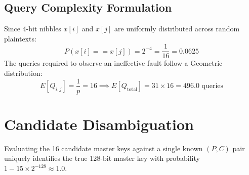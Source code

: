 \subsection{Query Complexity Formulation}
Since 4-bit nibbles $x[i]$ and $x[j]$ are uniformly distributed across random plaintexts:
\begin{equation}
    P(x[i] == x[j]) = 2^{-4} = \frac{1}{16} = 0.0625
\end{equation}
The queries required to observe an ineffective fault follow a Geometric distribution:
\begin{equation}
    E[Q_{i, j}] = \frac{1}{p} = 16 \implies E[Q_{\text{total}}] = 31 \times 16 = 496.0 \text{ queries}
\end{equation}

\section{Candidate Disambiguation}
\label{sec:disambiguation}
Evaluating the 16 candidate master keys against a single known $(P, C)$ pair uniquely identifies the true 128-bit master key with probability $1 - 15 \times 2^{-128} \approx 1.0$.
